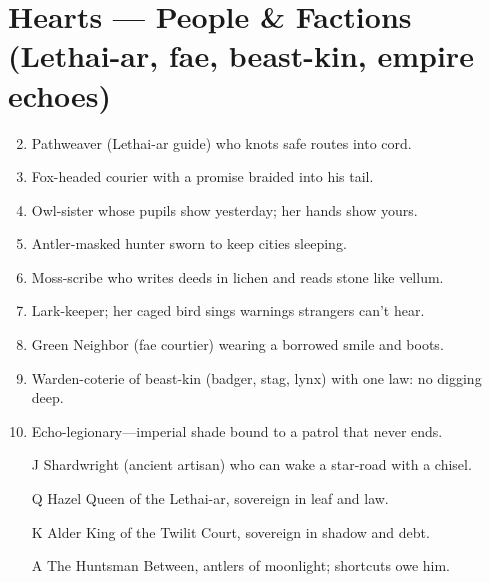 \section*{Hearts --- People \& Factions (Lethai-ar, fae, beast-kin, empire echoes)}
\begin{enumerate}
\setcounter{enumi}{1}
\item Pathweaver (Lethai-ar guide) who knots safe routes into cord.
\item Fox-headed courier with a promise braided into his tail.
\item Owl-sister whose pupils show yesterday; her hands show yours.
\item Antler-masked hunter sworn to keep cities sleeping.
\item Moss-scribe who writes deeds in lichen and reads stone like vellum.
\item Lark-keeper; her caged bird sings warnings strangers can't hear.
\item Green Neighbor (fae courtier) wearing a borrowed smile and boots.
\item Warden-coterie of beast-kin (badger, stag, lynx) with one law: no digging deep.
\item Echo-legionary---imperial shade bound to a patrol that never ends.
\item[J] Shardwright (ancient artisan) who can wake a star-road with a chisel.
\item[Q] Hazel Queen of the Lethai-ar, sovereign in leaf and law.
\item[K] Alder King of the Twilit Court, sovereign in shadow and debt.
\item[A] The Huntsman Between, antlers of moonlight; shortcuts owe him.
\end{enumerate}

